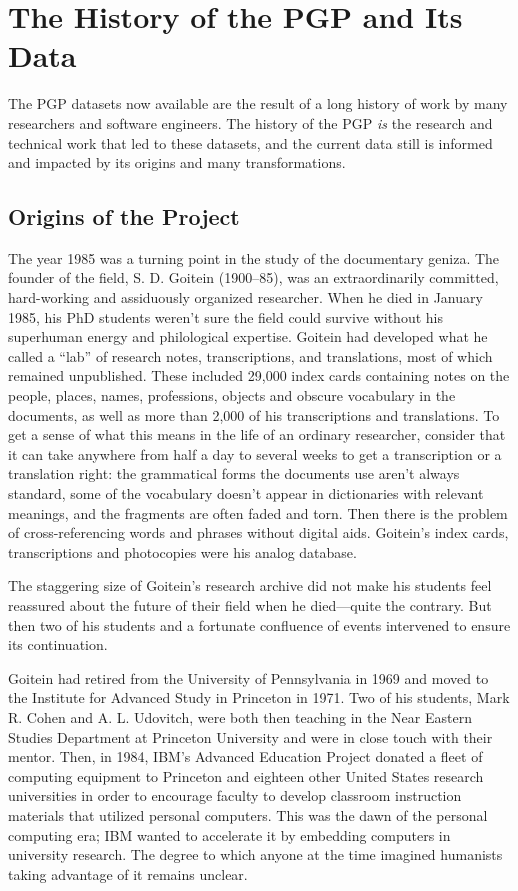 \documentclass{article}
\begin{document}
\section{The History of the PGP and Its Data}

The PGP datasets now available are the result of a long history of work by many researchers and software engineers.  The history of the PGP \textit{is} the research and technical work that led to these datasets, and the current data still is informed and impacted by its origins and many transformations.

\subsection{Origins of the Project}

The year 1985 was a turning point in the study of the documentary geniza. The founder of the field, S. D. Goitein (1900–85), was an extraordinarily committed, hard-working and assiduously organized researcher. When he died in January 1985, his PhD students weren’t sure the field could survive without his superhuman energy and philological expertise. Goitein had developed what he called a “lab” of research notes, transcriptions, and translations, most of which remained unpublished. These included 29,000 index cards containing notes on the people, places, names, professions, objects and obscure vocabulary in the documents, as well as more than 2,000 of his transcriptions and translations. To get a sense of what this means in the life of an ordinary researcher, consider that it can take anywhere from half a day to several weeks to get a transcription or a translation right: the grammatical forms the documents use aren’t always standard, some of the vocabulary doesn’t appear in dictionaries with relevant meanings, and the fragments are often faded and torn. Then there is the problem of cross-referencing words and phrases without digital aids. Goitein’s index cards, transcriptions and photocopies were his analog database. 

The staggering size of Goitein’s research archive did not make his students feel reassured about the future of their field when he died—quite the contrary. But then two of his students and a fortunate confluence of events intervened to ensure its continuation. 

Goitein had retired from the University of Pennsylvania in 1969 and moved to the Institute for Advanced Study in Princeton in 1971. Two of his students, Mark R. Cohen and A. L. Udovitch, were both then teaching in the Near Eastern Studies Department at Princeton University and were in close touch with their mentor. Then, in 1984, IBM’s Advanced Education Project donated a fleet of computing equipment to Princeton and eighteen other United States research universities in order to encourage faculty to develop classroom instruction materials that utilized personal computers. This was the dawn of the personal computing era; IBM wanted to accelerate it by embedding computers in university research. The degree to which anyone at the time imagined humanists taking advantage of it remains unclear.
\end{document}
